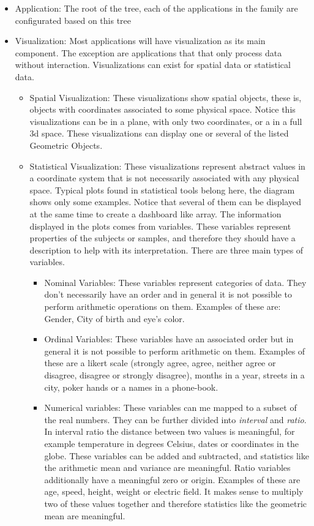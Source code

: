 \begin{itemize}
\item Application: The root of the tree, each of the applications in the family are configurated based on this tree
\item Visualization: Most applications will have visualization as its main component. The exception are applications that that only process data without interaction. Visualizations can exist for spatial data or statistical data.
\begin{itemize}
\item Spatial Visualization: These visualizations show spatial objects, these is, objects with coordinates associated to some physical space. Notice this visualizations can be in a plane, with only two coordinates, or a in a full 3d space. These visualizations can display one or several of the listed Geometric Objects.
\item Statistical Visualization: These visualizations represent abstract values in a coordinate system that is not necessarily associated with any physical space. Typical plots found in statistical tools belong here, the diagram shows only some examples. Notice that several of them can be displayed at the same time to create a dashboard like array. The information displayed in the plots comes from variables. These variables represent properties of the subjects or samples, and therefore they should have a description to help with its interpretation. There are three main types of variables.
\begin{itemize}
\item Nominal Variables: These variables represent categories of data. They don't necessarily have an order and in general it is not possible to perform arithmetic operations on them. Examples of these are: Gender, City of birth and eye's color.
\item Ordinal Variables: These variables have an associated order but in general it is not possible to perform arithmetic on them. Examples of these are a likert scale (strongly agree, agree, neither agree or disagree, disagree or strongly disagree), months in a year, streets in a city, poker hands or a names in a phone-book.
\item Numerical variables: These variables can me mapped to a subset of the real numbers. They can be further divided into \emph{interval} and  \emph{ratio}. In interval ratio the distance between two values is meaningful, for example temperature in degrees Celsius, dates or coordinates in the globe. These variables can be added and subtracted, and statistics like the arithmetic mean and variance are meaningful. Ratio variables additionally have a meaningful zero or origin. Examples of these are age, speed, height, weight or electric field. It makes sense to multiply two of these values together and therefore statistics like the geometric mean are meaningful.

\end{itemize}
\end{itemize}
\end{itemize}
